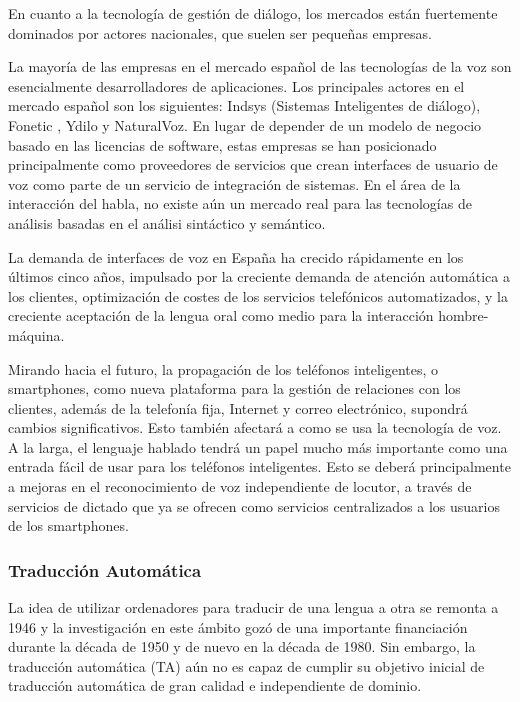 \begin{multicols}{2}
En cuanto a la tecnología de gestión de diálogo, los mercados están fuertemente dominados por actores nacionales, que suelen ser pequeñas empresas.
\columnbreak

La mayoría de las empresas en el mercado español de las tecnologías de la voz son esencialmente desarrolladores de aplicaciones. Los principales actores en el mercado español son los siguientes: Indsys (Sistemas Inteligentes de diálogo), Fonetic , Ydilo y NaturalVoz. En lugar de depender de un modelo de negocio basado en las licencias de software, estas empresas se han posicionado principalmente como proveedores de servicios que crean interfaces de usuario de voz como parte de un servicio de integración de sistemas. En el área de la interacción del habla, no existe aún un mercado real para las tecnologías de análisis basadas en el análisi sintáctico y semántico.

La demanda de interfaces de voz en España ha crecido rápidamente en los últimos cinco años, impulsado por la creciente demanda de atención automática a los clientes, optimización de costes de los servicios telefónicos automatizados, y la creciente aceptación de la lengua oral como medio para la interacción hombre-máquina.

Mirando hacia el futuro, la propagación de los teléfonos inteligentes, o smartphones, como nueva plataforma para la gestión de relaciones con los clientes, además de la telefonía fija, Internet y correo electrónico, supondrá cambios significativos. Esto también afectará a como se usa la tecnología de voz. A la larga, el lenguaje hablado tendrá un papel mucho más importante como una entrada fácil de usar para los teléfonos inteligentes. Esto se deberá principalmente a mejoras en el reconocimiento de voz independiente de locutor, a través de servicios de dictado que ya se ofrecen como servicios centralizados a los usuarios de los smartphones. 

\subsubsection{Traducción Automática}

La idea de utilizar ordenadores para traducir de una lengua a otra se remonta a 1946 y la investigación en este ámbito gozó de una importante financiación durante la década de 1950 y de nuevo en la década de 1980. Sin embargo, la traducción automática (TA) aún no es capaz de cumplir su objetivo inicial de traducción automática de gran calidad e independiente de dominio.


\end{multicols}
